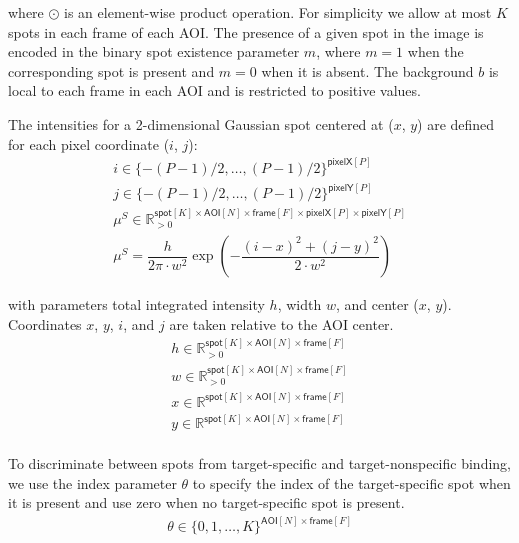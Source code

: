 \noindent
where $\odot$ is an element-wise product operation. For simplicity we allow at most $K$ spots in each frame of each AOI. The presence of a given spot in the image is encoded in the binary spot existence parameter $m$, where $m = 1$ when the corresponding spot is present and $m = 0$ when it is absent. The background $b$ is local to each frame in each AOI and is restricted to positive values.



The intensities for a 2-dimensional Gaussian spot centered at ($x$, $y$) are defined for each pixel coordinate ($i$, $j$):
%
\begin{gather*}
    i \in \{-(P-1)/2, \dots, (P-1)/2\}^{\mathsf{pixelX}[P]} \\
    j \in \{-(P-1)/2, \dots, (P-1)/2\}^{\mathsf{pixelY}[P]} \\
    \mu^S \in \mathbb{R}_{>0}^{\mathsf{spot}[K] \times \mathsf{AOI}[N] \times \mathsf{frame}[F] \times \mathsf{pixelX}[P] \times \mathsf{pixelY}[P]}  \\
    \mu^S = \dfrac{h}{2 \pi \cdot w^2} \exp{\left( -\dfrac{(i-x)^2 + (j-y)^2}{2 \cdot w^2} \right)}
\end{gather*}

\noindent
with parameters total integrated intensity $h$, width $w$, and center ($x$, $y$). Coordinates $x$, $y$, $i$, and $j$ are taken relative to the AOI center. 
%
\begin{gather*}
    h \in \mathbb{R}_{>0}^{\mathsf{spot}[K] \times \mathsf{AOI}[N] \times \mathsf{frame}[F]} \\
    w \in \mathbb{R}_{>0}^{\mathsf{spot}[K] \times \mathsf{AOI}[N] \times \mathsf{frame}[F]} \\
    x \in \mathbb{R}^{\mathsf{spot}[K] \times \mathsf{AOI}[N] \times \mathsf{frame}[F]} \\
    y \in \mathbb{R}^{\mathsf{spot}[K] \times \mathsf{AOI}[N] \times \mathsf{frame}[F]} \\
\end{gather*}



To discriminate between spots from target-specific and target-nonspecific binding, we use the index parameter $\theta$ to specify the index of the target-specific spot when it is present and use zero when no target-specific spot is present.
%
\begin{gather*}
    \theta \in \{ 0, 1, \dots, K \}^{ \mathsf{AOI}[N] \times \mathsf{frame}[F] } \\
\end{gather*}

